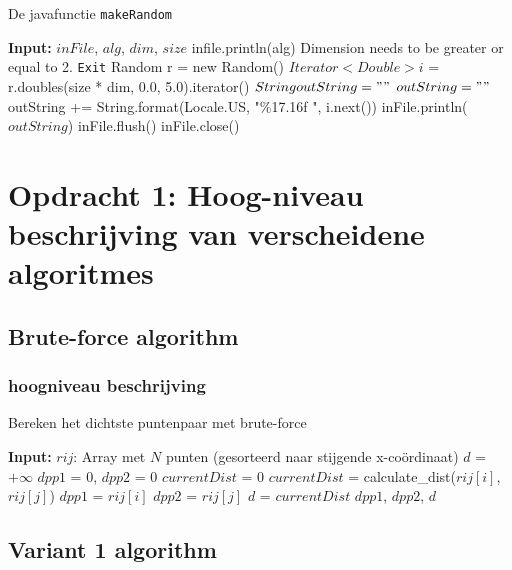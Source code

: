 \documentclass[12pt]{article}
\begin{document}
\begin{algorithm}
\caption{De javafunctie \texttt{makeRandom}}
\begin{algorithmic}
\STATE \textbf{Input:} $inFile$, $alg$, $dim$, $size$
\STATE infile.println(alg)
	\PRINT Dimension needs to be greater or equal to 2.
	\STATE \texttt{Exit}
\ENDIF
\STATE Random r = new Random()
\STATE $Iterator<Double> i$ = r.doubles(size * dim, 0.0, 5.0).iterator()
\STATE $String outString = ""$
	\STATE $outString = ""$
		\STATE outString += String.format(Locale.US, "\%17.16f ", i.next())
	\ENDFOR
	\STATE inFile.println($outString$)
\ENDWHILE
\STATE inFile.flush()
\STATE inFile.close()
\end{algorithmic}
\end{algorithm}

\section{Opdracht 1: Hoog-niveau beschrijving van verscheidene algoritmes}

\subsection{Brute-force algorithm}

\subsubsection{hoogniveau beschrijving}

\begin{algorithm}
\caption{Bereken het dichtste puntenpaar met brute-force}
\begin{algorithmic}
	\STATE \textbf{Input:}  $rij$: Array met $N$ punten (gesorteerd naar stijgende x-co\"ordinaat)
  \STATE $d$ = $+\infty$
	\STATE $dpp1$ = 0, $dpp2$ = 0
  \STATE $currentDist$ = 0
      \STATE $currentDist$ = calculate\_dist($rij[i]$, $rij[j]$)
				\STATE $dpp1$ = $rij[i]$
				\STATE $dpp2$ = $rij[j]$
        \STATE $d$ = $currentDist$
  		\ENDIF
    \ENDFOR
  \ENDFOR
  \RETURN $dpp1$, $dpp2$, $d$
\end{algorithmic}
\end{algorithm}

\newpage
\subsection{Variant 1 algorithm}
\end{document}
